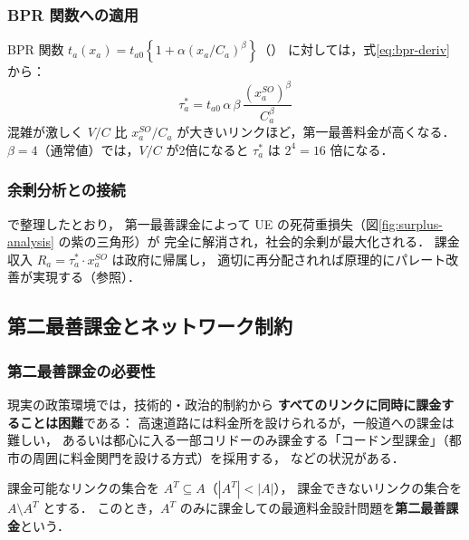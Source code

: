 \subsubsection*{BPR 関数への適用}

BPR 関数 $t_a(x_a) = t_{a0}\left\{1 + \alpha(x_a/C_a)^\beta\right\}$（）
に対しては，式\eqref{eq:bpr-deriv} から：
\begin{equation}
  \tau_a^* = t_{a0}\,\alpha\,\beta\,\frac{(x_a^{SO})^{\beta}}{C_a^{\beta}}
  \label{eq:first-best-bpr-toll}
\end{equation}
混雑が激しく $V/C$ 比 $x_a^{SO}/C_a$ が大きいリンクほど，第一最善料金が高くなる．
$\beta=4$（通常値）では，$V/C$ が2倍になると $\tau_a^*$ は $2^4 = 16$ 倍になる．

\subsubsection*{余剰分析との接続}

  で整理したとおり，
第一最善課金によって UE の死荷重損失（図\ref{fig:surplus-analysis} の紫の三角形）が
完全に解消され，社会的余剰が最大化される．
課金収入 $R_a = \tau_a^* \cdot x_a^{SO}$ は政府に帰属し，
適切に再分配されれば原理的にパレート改善が実現する（参照）．

\subsection{第二最善課金とネットワーク制約}
\label{subsec:second-best}

\subsubsection*{第二最善課金の必要性}

現実の政策環境では，技術的・政治的制約から
\textbf{すべてのリンクに同時に課金することは困難}である：
高速道路には料金所を設けられるが，一般道への課金は難しい，
あるいは都心に入る一部コリドーのみ課金する「コードン型課金」（都市の周囲に料金関門を設ける方式）を採用する，
などの状況がある\cite{土木学会1998}．

課金可能なリンクの集合を $A^T \subseteq A$（$|A^T| < |A|$），
課金できないリンクの集合を $A \setminus A^T$ とする．
このとき，$A^T$ のみに課金しての最適料金設計問題を\textbf{第二最善課金}という．

